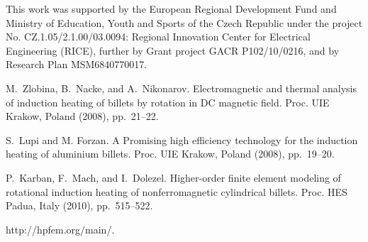 This work was supported by the European Regional Development Fund and Ministry of Education, Youth and Sports of the Czech Republic under the project No. CZ.1.05/2.1.00/03.0094: Regional Innovation Center for Electrical Engineering (RICE), further by Grant project GACR P102/10/0216, and by Research Plan MSM6840770017.


\begin{thebibliography}{10}

{\sc M.~Zlobina, B.~Nacke, and A.~Nikonarov}. {Electromagnetic and
thermal analysis of induction heating of billets by rotation in DC
magnetic field}. Proc. UIE Krakow, Poland (2008), pp.~21--22.

{\sc S.~Lupi and M. Forzan}. {A Promising high efficiency
technology for the induction heating of aluminium billets}. Proc.
UIE Krakow, Poland (2008), pp.~19--20.

{\sc P.~Karban, F.~Mach, and I.~Dolezel}. {Higher-order finite
element modeling of rotational induction heating of
nonferromagnetic cylindrical billets}. Proc. HES Padua, Italy
(2010), pp.~515--522.

{http://hpfem.org/main/}.

\end{thebibliography}